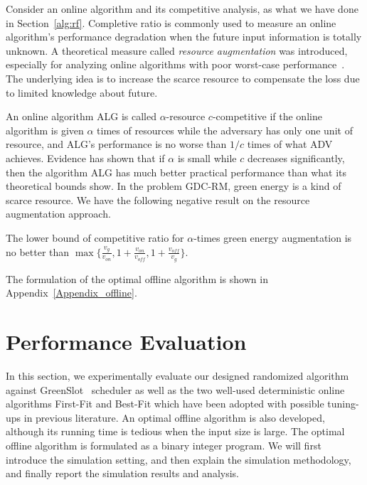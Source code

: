 \documentclass[conference]{IEEEtran}
\begin{document}
Consider an online algorithm and its competitive analysis, as what we have done in Section~\ref{alg:rf}. Completive ratio is commonly used to measure an online algorithm's performance degradation when the future input information is totally unknown. A theoretical measure called \emph{resource augmentation} was introduced, especially for analyzing online algorithms with poor worst-case performance~\cite{KalyanasundaramP00, PruhsS10, PhillipsSTW02}. The underlying idea is to increase the scarce resource to compensate the loss due to limited knowledge about future.

An online algorithm ALG is called $\alpha$-resource $c$-competitive if the online algorithm is given $\alpha$ times of resources while the adversary has only one unit of resource, and ALG's performance is no worse than $1 / c$ times of what ADV achieves. Evidence has shown that if $\alpha$ is small while $c$ decreases significantly, then the algorithm ALG has much better practical performance than what its theoretical bounds show. In the problem GDC-RM, green energy is a kind of scarce resource. We have the following negative result on the resource augmentation approach.

\begin{theorem}
The lower bound of competitive ratio for $\alpha$-times green energy augmentation is no better than $\max\{ \frac{v_g}{v_{on}}, 1 + \frac{v_{on}}{v_{off}}, 1 + \frac{v_{off}}{v_g}\}$.
\label{thm:reau}
\end{theorem}

The formulation of the optimal offline algorithm is shown in Appendix~\ref{Appendix_offline}.




\section{Performance Evaluation}

In this section, we experimentally evaluate our designed randomized algorithm against GreenSlot~\cite{GoiriL11} scheduler as well as the two well-used deterministic online algorithms First-Fit and Best-Fit which have been adopted with possible tuning-ups in previous literature. An optimal offline algorithm is also developed, although its running time is tedious when the input size is large. The optimal offline algorithm is formulated as a binary integer program. We will first introduce the simulation setting, and then explain the simulation methodology, and finally report the simulation results and analysis.
\end{document}
